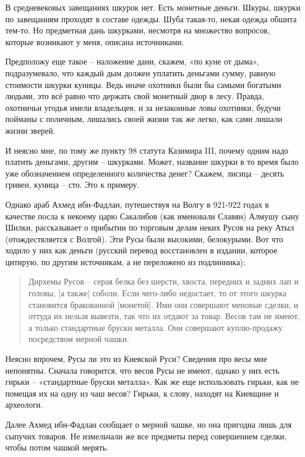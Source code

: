 В средневековых завещаниях шкурок нет. Есть монетные деньги. Шкуры, шкурки по завещаниям проходят в составе одежды. Шуба такая-то, некая одежда обшита тем-то. Но предметная дань шкурками, несмотря на множество вопросов, которые возникают у меня, описана источниками.

Предположу еще такое – наложение дани, скажем, «по куне от дыма», подразумевало, что каждый дым должен уплатить деньгами сумму, равную стоимости шкурки куницы. Ведь иначе охотники были бы самыми богатыми людьми, это всё равно что держать свой монетный двор в лесу. Правда, охотничьи угодья имели владельцев, и за незаконные ловы охотники, будучи пойманы с поличным, лишались своей жизни так же легко, как сами лишали жизни зверей.

И неясно мне, по тому же пункту 98 статута Казимира III, почему одним надо платить деньгами, другим – шкурками. Может, название шкурки в то время было уже обозначением определенного количества денег? Скажем, лисица – десять гривен, куница – сто. Это к примеру.

Однако араб Ахмед ибн-Фадлан, путешествуя на Волгу в 921-922 годах в качестве посла к некоему царю Сакалибов (как именовали Славян) Алмушу сыну Шилки, рассказывает о прибытии по торговым делам неких Русов на реку Атыл (отождествляется с Волгой). Эти Русы были высокими, белокурыми. Вот что ходило у них как деньги (русский перевод восстановлен в издании, которое цитирую, по другим источникам, а не переложено из подлинника)\cite{fadlan01}:

\begin{quotation}
Дирхемы Русов – серая белка без шерсти, хвоста, передних и задних лап и головы, [а также] соболи. Если чего-либо недостает, то от этого шкурка становится бракованной [монетой]. Ими они совершают меновые сделки, и оттуда их нельзя вывезти, так что их отдают за товар. Весов там не имеют, а только стандартные бруски металла. Они совершают куплю-продажу посредством мерной чашки.
\end{quotation}

Неясно впрочем, Русы ли это из Киевской Руси? Сведения про весы мне непонятны. Сначала говорится, что весов Русы не имеют, однако у них есть гирьки – «стандартные бруски металла». Как же еще использовать гирьки, как не помещая их на одну из чаш весов? Гирьки, к слову, находят на Киевщине и археологи. 

Далее Ахмед ибн-Фадлан сообщает о мерной чашке, но она пригодна лишь для сыпучих товаров. Не измельчали же все предметы перед совершением сделки, чтобы потом чашкой мерять.  

